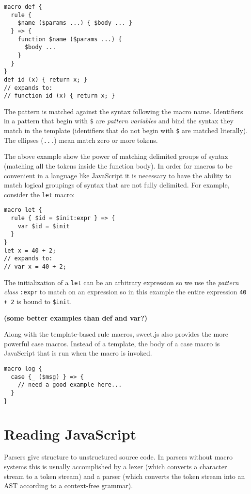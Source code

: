 \documentclass[preprint,10pt]{sigplanconf}
\begin{document}
\begin{lstlisting}
macro def {
  rule { 
    $name ($params ...) { $body ... } 
  } => {
    function $name ($params ...) {
      $body ...
    }
  }
}
def id (x) { return x; }
// expands to:
// function id (x) { return x; }
\end{lstlisting}

The pattern is matched against the syntax following the macro name.
Identifiers in a pattern that begin with \lstinline!$! are
\emph{pattern variables} and bind the syntax they match in the
template (identifiers that do not begin with \lstinline!$! are matched
literally). The ellipses (\lstinline!...!) mean match zero or more
tokens.

The above example show the power of matching delimited groups of
syntax (\ie matching all the tokens inside the function body). In
order for macros to be convenient in a language like JavaScript it is
necessary to have the ability to match logical groupings of syntax
that are not fully delimited. For example, consider the
\lstinline!let! macro:

\begin{lstlisting}
macro let {
  rule { $id = $init:expr } => {
    var $id = $init
  }
}
let x = 40 + 2;
// expands to:
// var x = 40 + 2;
\end{lstlisting}

The initialization of a \lstinline!let! can be an arbitrary expression
so we use the \emph{pattern class} \lstinline!:expr! to match on an
expression so in this example the entire expression \lstinline!40 + 2!
is bound to \lstinline!$init!.

\textbf{(some better examples than def and var?)}

Along with the template-based rule macros, sweet.js also provides the
more powerful case macros. Instead of a template, the body of a case
macro is JavaScript that is run when the macro is invoked.

\begin{lstlisting}
macro log {
  case {_ ($msg) } => {
    // need a good example here...
  }
}
\end{lstlisting}



\section{Reading JavaScript}
\label{sec:read}

Parsers give structure to unstructured source code. In parsers without
macro systems this is usually accomplished by 
a lexer (which converts a character stream to a token stream) and a
parser (which converts the token stream into an AST according to a
context-free grammar).
\end{document}
